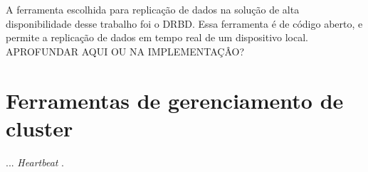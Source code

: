 A ferramenta escolhida para replicação de dados na solução de alta disponibilidade desse trabalho foi o \ac{DRBD}. Essa ferramenta é de código
aberto, e permite a replicação de dados em tempo real de um dispositivo local. 
APROFUNDAR AQUI OU NA IMPLEMENTAÇÂO?

\section{Ferramentas de gerenciamento de cluster}
\label{section:toolcluster}

... \textit{Heartbeat} \cite{zaminhani2008}.


